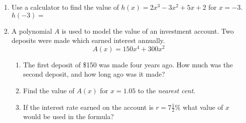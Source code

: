 \documentclass[12pt, twoside]{article}
\begin{document}
\begin{enumerate}
\item Use a calculator to find the value of $h(x)=2x^3-3x^2+5x+2$ for $x=-3$. \\[0.25cm] 
$h(-3) = $ \vspace{2cm}

\item A polynomial $A$ is used to model the value of an investment account. Two deposits were made which earned interest annually.  $$A(x)=150x^4+300x^2$$ 
\begin{enumerate}[itemsep=1cm]
    \item The first deposit of \$150 was made four years ago. How much was the second deposit, and how long ago was it made? \vspace{2cm}
    \item Find the value of $A(x)$ for $x = 1.05$ to the \emph{nearest cent}. \vspace{2cm}
    \item If the interest rate earned on the account is $r = 7 \frac{1}{2}\%$ what value of $x$ would be used in the formula? \vspace{2cm}
\end{enumerate}

\end{enumerate}
\end{document}
